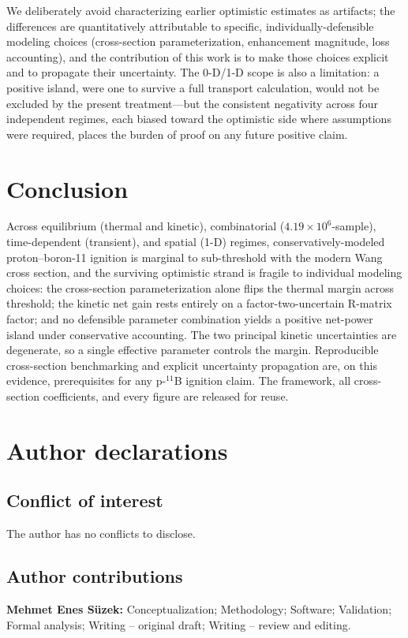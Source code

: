 \documentclass[aip,pop,reprint,amsmath,amssymb,floatfix]{revtex4-2}
\begin{document}
We deliberately avoid characterizing earlier optimistic estimates as artifacts; the differences are quantitatively attributable to specific, individually-defensible modeling choices (cross-section parameterization, enhancement magnitude, loss accounting), and the contribution of this work is to make those choices explicit and to propagate their uncertainty. The 0-D/1-D scope is also a limitation: a positive island, were one to survive a full transport calculation, would not be excluded by the present treatment---but the consistent negativity across four independent regimes, each biased toward the optimistic side where assumptions were required, places the burden of proof on any future positive claim.

\section{Conclusion}

Across equilibrium (thermal and kinetic), combinatorial ($4.19\times10^6$-sample), time-dependent (transient), and spatial (1-D) regimes, conservatively-modeled proton--boron-11 ignition is marginal to sub-threshold with the modern Wang cross section, and the surviving optimistic strand is fragile to individual modeling choices: the cross-section parameterization alone flips the thermal margin across threshold; the kinetic net gain rests entirely on a factor-two-uncertain R-matrix factor; and no defensible parameter combination yields a positive net-power island under conservative accounting. The two principal kinetic uncertainties are degenerate, so a single effective parameter controls the margin. Reproducible cross-section benchmarking and explicit uncertainty propagation are, on this evidence, prerequisites for any p-$^{11}$B ignition claim. The framework, all cross-section coefficients, and every figure are released for reuse.

\section{Author declarations}

\subsection{Conflict of interest}
The author has no conflicts to disclose.

\subsection{Author contributions}
\textbf{Mehmet Enes S\"uzek:} Conceptualization; Methodology; Software; Validation; Formal analysis; Writing -- original draft; Writing -- review and editing.
\end{document}

